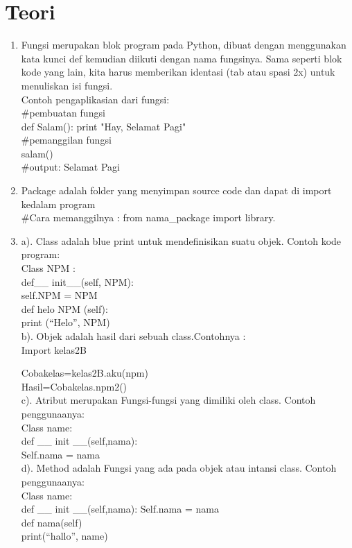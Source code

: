 \chapter*{Teori}

\begin{enumerate}
	\item Fungsi merupakan blok program pada Python, dibuat dengan menggunakan kata kunci def kemudian diikuti dengan nama fungsinya. Sama seperti blok kode yang lain, kita harus memberikan identasi (tab atau spasi 2x) untuk menuliskan isi fungsi.\\
	Contoh pengaplikasian dari fungsi:\\
	\#pembuatan fungsi\\
	  def Salam():  
        print "Hay, Selamat Pagi"\\
	 \#pemanggilan fungsi \\ 
	    salam()\\
	  \#output: Selamat Pagi \\
	
	\item Package adalah folder yang menyimpan source code dan dapat di import kedalam program\\
	\#Cara memanggilnya : from nama\_package import library.
	
	\item a). Class adalah blue print  untuk mendefinisikan suatu objek. Contoh kode program: \\
	Class NPM :\\
	def\_\_ init\_\_(self, NPM):\\
		self.NPM = NPM\\
	def  helo NPM (self):\\
		print (“Helo”, NPM)\\
	b). Objek adalah hasil dari sebuah class.Contohnya :\\
	Import kelas2B
	
	Cobakelas=kelas2B.aku(npm)\\
 	Hasil=Cobakelas.npm2()\\
	c).	Atribut merupakan  Fungsi-fungsi yang dimiliki oleh class. Contoh penggunaanya:\\
	Class name:\\
	def \_\_ init \_\_(self,nama):\\
	Self.nama = nama\\
	d). Method adalah Fungsi yang ada pada objek atau intansi class. Contoh penggunaanya:\\
	Class name:\\
	def \_\_ init \_\_(self,nama):
	Self.nama = nama\\
	def nama(self)\\
	print(“hallo”, name)\\
	

\end{enumerate}
